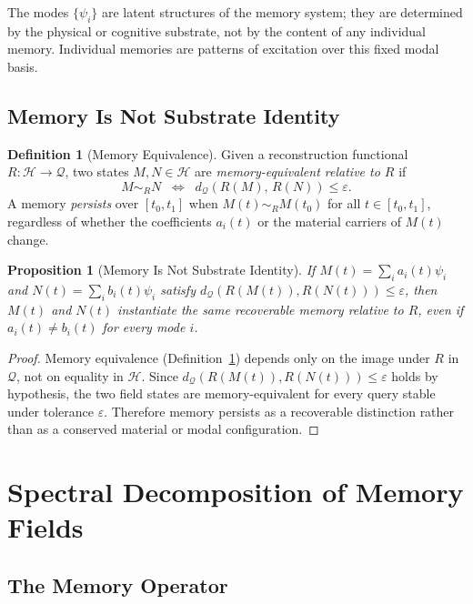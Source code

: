 \documentclass[12pt, oneside]{book}
\theoremstyle{plain}
\newtheorem{proposition}[theorem]{Proposition}
\theoremstyle{definition}
\newtheorem{definition}[theorem]{Definition}
\theoremstyle{remark}
\newcommand{\calH}{\mathcal{H}}
\newcommand{\calQ}{\mathcal{Q}}
\begin{document}
The modes $\{\psi_i\}$ are latent structures of the memory
system; they are determined by the physical or cognitive
substrate, not by the content of any individual memory.
Individual memories are patterns of excitation over this
fixed modal basis.

\section{Memory Is Not Substrate Identity}

\begin{definition}[Memory Equivalence]
\label{def:mem-equiv}
Given a reconstruction functional $R : \calH \to \calQ$,
two states $M, N \in \calH$ are
\emph{memory-equivalent relative to $R$} if
\[
  M \sim_R N
  \;\;\Longleftrightarrow\;\;
  d_{\calQ}(R(M),\, R(N)) \leq \varepsilon.
\]
A memory \emph{persists} over $[t_0, t_1]$ when
$M(t) \sim_R M(t_0)$ for all $t \in [t_0, t_1]$,
regardless of whether the coefficients $a_i(t)$ or
the material carriers of $M(t)$ change.
\end{definition}

\begin{proposition}[Memory Is Not Substrate Identity]
\label{prop:not-substrate}
If $M(t) = \sum_i a_i(t)\psi_i$ and
$N(t) = \sum_i b_i(t)\psi_i$ satisfy
$d_{\calQ}(R(M(t)), R(N(t))) \leq \varepsilon$,
then $M(t)$ and $N(t)$ instantiate the same recoverable
memory relative to $R$, even if
$a_i(t) \neq b_i(t)$ for every mode $i$.
\end{proposition}

\begin{proof}
Memory equivalence (Definition~\ref{def:mem-equiv}) depends
only on the image under $R$ in $\calQ$, not on equality
in $\calH$.
Since $d_{\calQ}(R(M(t)), R(N(t))) \leq \varepsilon$
holds by hypothesis, the two field states are
memory-equivalent for every query stable under tolerance
$\varepsilon$.
Therefore memory persists as a recoverable distinction
rather than as a conserved material or modal configuration.
\end{proof}

\chapter{Spectral Decomposition of Memory Fields}
\label{ch:spectral}

\section{The Memory Operator}
\end{document}
